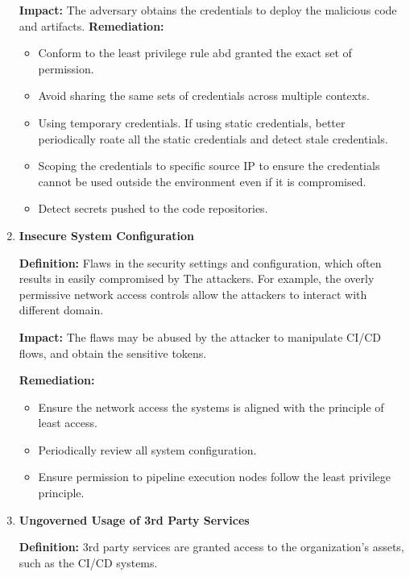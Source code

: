 \begin{enumerate}[label=(\arabic*)]
    \textbf{Impact: }
        The adversary obtains the credentials to deploy the malicious code and artifacts.
    \textbf{Remediation:}
        \begin{itemize}
            \item Conform to the least privilege rule abd granted the exact set of permission.
            \item Avoid sharing the same sets of credentials across multiple contexts.
            \item Using temporary credentials. If using static credentials, better periodically roate
            all the static credentials and detect stale credentials.
            \item Scoping the credentials to specific source IP to ensure the credentials cannot be used
            outside the environment even if it is compromised.
            \item Detect secrets pushed to the code repositories.
        \end{itemize}
    \item \textbf{Insecure System Configuration}

    \textbf{Definition: }
        Flaws in the security settings and configuration, which often results in easily compromised by The
        attackers. For example, the overly permissive network access controls allow the attackers to interact
        with different domain.

    \textbf{Impact: }
        The flaws may be abused by the attacker to manipulate CI/CD flows, and obtain the sensitive tokens.
    
    \textbf{Remediation:}
        \begin{itemize}
            \item Ensure the network access the systems is aligned with the principle of least access.
            \item Periodically review all system configuration.
            \item Ensure permission to pipeline execution nodes follow the least privilege principle. 
        \end{itemize}
    \item \textbf{Ungoverned Usage of 3rd Party Services}

    \textbf{Definition: }   
        3rd party services are granted access to the organization's assets, such as the CI/CD systems.


\end{enumerate}
